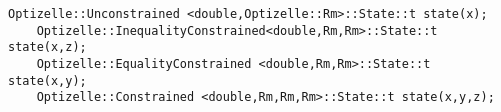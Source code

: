 \begin{lstlisting}[style=C++]
    Optizelle::Unconstrained <double,Optizelle::Rm>::State::t state(x);
    Optizelle::InequalityConstrained<double,Rm,Rm>::State::t state(x,z);
    Optizelle::EqualityConstrained <double,Rm,Rm>::State::t state(x,y);
    Optizelle::Constrained <double,Rm,Rm,Rm>::State::t state(x,y,z);
\end{lstlisting}
